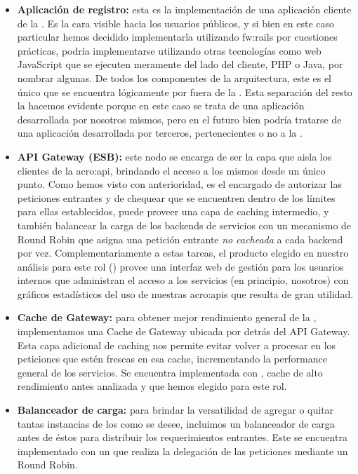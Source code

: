 \begin{itemize}
  \item \textbf{Aplicación de registro:} esta es la implementación de una aplicación cliente de la {\cloud}. Es la cara visible hacia los usuarios públicos, y si bien en este caso particular hemos decidido implementarla utilizando \gls{fw:rails} por cuestiones prácticas, podría implementarse utilizando otras tecnologías como  web JavaScript que se ejecuten meramente del lado del cliente, PHP o Java, por nombrar algunas. De todos los componentes de la arquitectura, este es el único que se encuentra lógicamente por fuera de la {\cloud}. Esta separación del resto la hacemos evidente porque en este caso se trata de una aplicación desarrollada por nosotros mismos, pero en el futuro bien podría tratarse de una aplicación desarrollada por terceros, pertenecientes o no a la {\unlp}.

  \item \textbf{API Gateway (ESB):} este nodo se encarga de ser la capa que aisla los clientes de la \gls{acro:api}, brindando el acceso a los mismos desde un único punto. Como hemos visto con anterioridad, es el encargado de autorizar las peticiones entrantes y de chequear que se encuentren dentro de los límites para ellas establecidos, puede proveer una capa de caching intermedio, y también balancear la carga de los backends de servicios con un mecanismo de Round Robin que asigna una petición entrante \textit{no cacheada} a cada backend por vez. Complementariamente a estas tareas, el producto elegido en nuestro análisis para este rol () provee una interfaz web de gestión para los usuarios internos que administran el acceso a los servicios (en principio, nosotros) con gráficos estadísticos del uso de nuestras \glspl{acro:api} que resulta de gran utilidad.

  \item \textbf{Cache de Gateway:} para obtener mejor rendimiento general de la {\cloud}, implementamos una Cache de Gateway ubicada por detrás del API Gateway. Esta capa adicional de caching nos permite evitar volver a procesar en los  peticiones que estén frescas en esa cache, incrementando la performance general de los servicios. Se encuentra implementada con , cache de alto rendimiento antes analizada y que hemos elegido para este rol.

  \item \textbf{Balanceador de carga:} para brindar la versatilidad de agregar o quitar tantas instancias de los  como se desee, incluimos un balanceador de carga antes de éstos para distribuir los requerimientos entrantes. Este se encuentra implementado con un  que realiza la delegación de las peticiones mediante un Round Robin.


\end{itemize}

